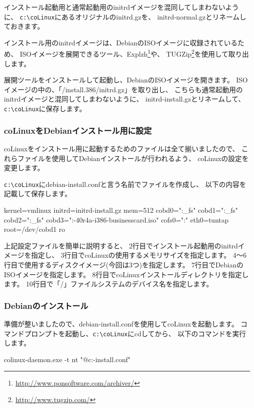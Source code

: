 \documentclass[mingoth,a4paper]{jsarticle}
\begin{document}
インストール起動用と通常起動用のinitrdイメージを混同してしまわないように、
\verb|c:\coLinux|にあるオリジナルのinitrd.gzを、
initrd-normal.gzとリネームしておきます。

インストール用のinitrdイメージは、DebianのISOイメージに収録されているため、
ISOイメージを展開できるツール、Explzh\footnote{\url{http://www.ponsoftware.com/archiver/}}や、
TUGZip\footnote{\url{http://www.tugzip.com/}}を使用して取り出します。

展開ツールをインストールして起動し、DebianのISOイメージを開きます。
ISOイメージの中の、「/install.386/initrd.gz」を取り出し、
こちらも通常起動用のinitrdイメージと混同してしまわないように、
initrd-install.gzとリネームして、\verb|c:\coLinux|に保存します。


\subsubsection{coLinuxをDebianインストール用に設定}
coLinuxをインストール用に起動するためのファイルは全て揃いましたので、
これらファイルを使用してDebianインストールが行われるよう、
coLinuxの設定を変更します。

\verb|c:\coLinux|にdebian-install.confと言う名前でファイルを作成し、
以下の内容を記載して保存します。

\begin{commandline}
kernel=vmlinux
initrd=initrd-install.gz
mem=512
cobd0="\DosDevices\C:\coLinux\swap_fs"
cobd1="\DosDevices\C:\coLinux\root_fs"
cobd2="\DosDevices\C:\coLinux\home_fs"
cobd3="\DosDevices\C:\coLinux\debian-40r4a-i386-businesscard.iso"
cofs0="\DosDevices\C:\coLinux"
eth0=tuntap
root=/dev/cobd1
ro
\end{commandline}

上記設定ファイルを簡単に説明すると、
2行目でインストール起動用のinitrdイメージを指定し、
3行目でcoLinuxの使用するメモリサイズを指定します。
4〜6行目で使用するディスクイメージ(今回は3つ)を指定します。
7行目でDebianのISOイメージを指定します。
8行目でcoLinuxインストールディレクトリを指定します。
10行目で「/」ファイルシステムのデバイス名を指定します。

\subsubsection{Debianのインストール}
準備が整いましたので、debian-install.confを使用してcoLinuxを起動します。
コマンドプロンプトを起動し、\verb|c:\coLinux|にcdしてから、
以下のコマンドを実行します。

\begin{commandline}
colinux-daemon.exe -t nt "@c:\coLinux\debian-install.conf"
\end{commandline}
\end{document}
